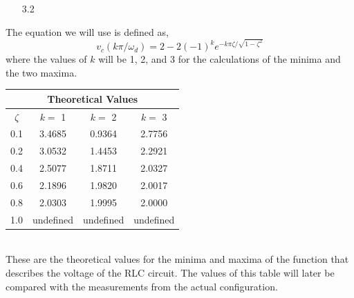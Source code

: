 \documentclass[12pt]{article}
\begin{document}
    \begin{itemize}
        \item[3.2]
    \end{itemize}
    \par The equation we will use is defined as,
    \[
        v_{c} (k \pi / \omega_{d}) = 2 - 2(-1)^{k} e^{-k \pi \zeta / \sqrt{1- \zeta^2}}
    \]
    where the values of $ k $ will be 1, 2, and 3 for the calculations of the minima and the two maxima.
    \begin{table}[h]
        \centering
        \begin{tabular}{cccc}
            \toprule
            \multicolumn{4}{c}{Theoretical Values} \\
            \midrule
            $ \zeta $ & $ k = $ 1 & $ k = $ 2 & $ k = $ 3 \\
            \midrule
            0.1 & 3.4685 & 0.9364 & 2.7756 \\
            0.2 & 3.0532 & 1.4453 & 2.2921 \\
            0.4 & 2.5077 & 1.8711 & 2.0327 \\
            0.6 & 2.1896 & 1.9820 & 2.0017 \\
            0.8 & 2.0303 & 1.9995 & 2.0000 \\
            1.0 & undefined & undefined & undefined \\
            \bottomrule
        \end{tabular}
    \end{table}
    \\
    These are the theoretical values for the minima and maxima of the function that describes the voltage of the RLC circuit. The values of this table will later be compared with the measurements from the actual configuration.
\end{document}
